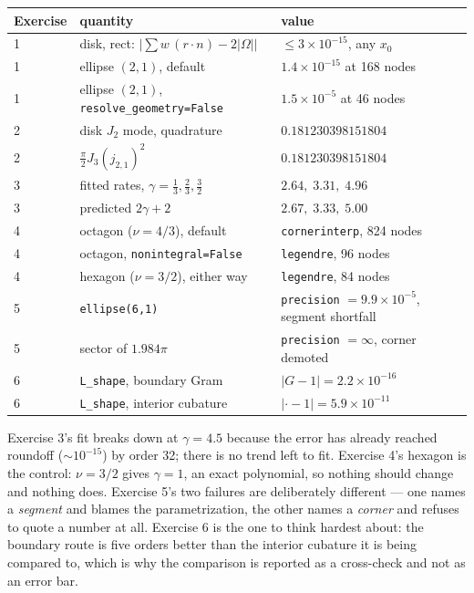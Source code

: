 \documentclass[11pt]{article}
\theoremstyle{definition}
\theoremstyle{remark}
\newcommand{\Om}{\Omega}
\newcommand{\code}[1]{\texttt{#1}}
\begin{document}
\medskip
\begin{center}
\begin{tabular}{lll}
\toprule
Exercise & quantity & value \\
\midrule
1 & disk, rect: $|\!\sum w\,(r\cdot n)-2|\Om||$ & $\le3\times10^{-15}$, any $x_0$\\
1 & ellipse $(2,1)$, default & $1.4\times10^{-15}$ at 168 nodes\\
1 & ellipse $(2,1)$, \code{resolve\_geometry=False} & $1.5\times10^{-5}$ at 46 nodes\\
\midrule
2 & disk $J_2$ mode, quadrature & $0.181230398151804$\\
2 & $\tfrac{\pi}{2}J_3(j_{2,1})^2$ & $0.181230398151804$\\
\midrule
3 & fitted rates, $\gamma=\tfrac13,\tfrac23,\tfrac32$ & $2.64,\;3.31,\;4.96$\\
3 & predicted $2\gamma+2$ & $2.67,\;3.33,\;5.00$\\
\midrule
4 & octagon ($\nu=4/3$), default & \code{cornerinterp}, 824 nodes\\
4 & octagon, \code{nonintegral=False} & \code{legendre}, 96 nodes\\
4 & hexagon ($\nu=3/2$), either way & \code{legendre}, 84 nodes\\
\midrule
5 & \code{ellipse(6,1)} & \code{precision} $=9.9\times10^{-5}$, segment shortfall\\
5 & sector of $1.984\pi$ & \code{precision} $=\infty$, corner demoted\\
\midrule
6 & \code{L\_shape}, boundary Gram & $|G-1| = 2.2\times10^{-16}$\\
6 & \code{L\_shape}, interior cubature & $|{\cdot}-1| = 5.9\times10^{-11}$\\
\bottomrule
\end{tabular}
\end{center}

\medskip\noindent
Exercise 3's fit breaks down at $\gamma=4.5$ because the error has already reached
roundoff ($\sim10^{-15}$) by order 32; there is no trend left to fit. Exercise 4's
hexagon is the control: $\nu=3/2$ gives $\gamma=1$, an exact polynomial, so
nothing should change and nothing does. Exercise 5's two failures are deliberately
different --- one names a \emph{segment} and blames the parametrization, the other
names a \emph{corner} and refuses to quote a number at all. Exercise 6 is the one
to think hardest about: the boundary route is five orders better than the interior
cubature it is being compared to, which is why the comparison is reported as a
cross-check and not as an error bar.
\end{document}
